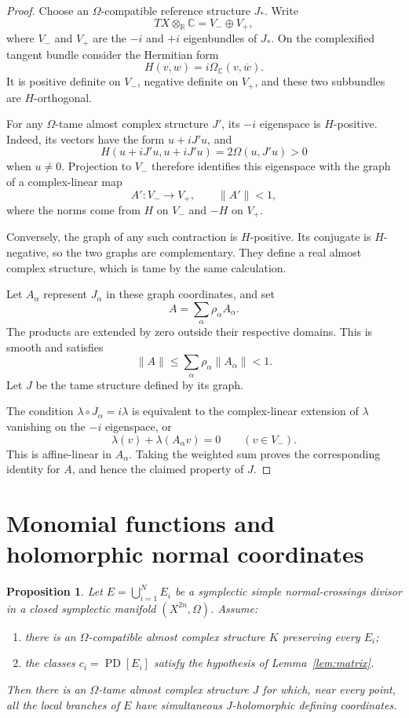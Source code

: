 \documentclass[11pt]{amsart}
\newtheorem{proposition}[theorem]{Proposition}
\theoremstyle{definition}
\theoremstyle{remark}
\newcommand{\R}{\mathbb R}
\newcommand{\C}{\mathbb C}
\newcommand{\PD}{\operatorname{PD}}
\begin{document}
\begin{proof}
Choose an $\Omega$-compatible reference structure $J_*$.
Write
\[
TX\otimes_{\R}\C=V_-\oplus V_+,
\]
where $V_-$ and $V_+$ are the $-i$ and $+i$ eigenbundles of
$J_*$.  On the complexified tangent bundle consider the
Hermitian form
\[
H(v,w)=i\Omega_{\C}(v,\overline w).
\]
It is positive definite on $V_-$, negative definite on $V_+$,
and these two subbundles are $H$-orthogonal.

For any $\Omega$-tame almost complex structure $J'$, its
$-i$ eigenspace is $H$-positive.  Indeed, its vectors have the
form $u+iJ'u$, and
\[
H(u+iJ'u,u+iJ'u)=2\Omega(u,J'u)>0
\]
when $u\neq0$.  Projection to $V_-$ therefore identifies this
eigenspace with the graph of a complex-linear map
\[
A':V_-\longrightarrow V_+,\qquad \|A'\|<1,
\]
where the norms come from $H$ on $V_-$ and $-H$ on $V_+$.

Conversely, the graph of any such contraction is $H$-positive.
Its conjugate is $H$-negative, so the two graphs are
complementary.  They define a real almost complex structure,
which is tame by the same calculation.

Let $A_\alpha$ represent $J_\alpha$ in these graph coordinates,
and set
\[
A=\sum_\alpha\rho_\alpha A_\alpha.
\]
The products are extended by zero outside their respective
domains.  This is smooth and satisfies
\[
\|A\|\leq\sum_\alpha\rho_\alpha\|A_\alpha\|<1.
\]
Let $J$ be the tame structure defined by its graph.

The condition $\lambda\circ J_\alpha=i\lambda$ is equivalent
to the complex-linear extension of $\lambda$ vanishing on the
$-i$ eigenspace, or
\[
\lambda(v)+\lambda(A_\alpha v)=0
\qquad(v\in V_-).
\]
This is affine-linear in $A_\alpha$.  Taking the weighted sum
proves the corresponding identity for $A$, and hence the
claimed property of $J$.
\end{proof}

\section{Monomial functions and holomorphic normal coordinates}

\begin{proposition}\label{prop:redundant-case}
Let $E=\bigcup_{i=1}^{N}E_i$ be a symplectic simple
normal-crossings divisor in a closed symplectic manifold
$(X^{2n},\Omega)$.  Assume:
\begin{enumerate}[label=\textup{(\alph*)}]
\item there is an $\Omega$-compatible almost complex structure
      $K$ preserving every $E_i$;
\item the classes $c_i=\PD[E_i]$ satisfy the hypothesis of
      Lemma~\ref{lem:matrix}.
\end{enumerate}
Then there is an $\Omega$-tame almost complex structure $J$
for which, near every point, all the local branches of $E$
have simultaneous $J$-holomorphic defining coordinates.
\end{proposition}
\end{document}
